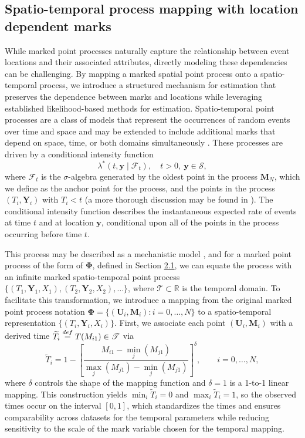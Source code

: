 \subsection{Spatio-temporal process mapping with location dependent marks}\label{stmapping}

While marked point processes naturally capture the relationship between
event locations and their associated attributes, directly modeling these
dependencies can be challenging. By mapping a marked spatial point
process onto a spatio-temporal process, we introduce a structured
mechanism for estimation that preserves the dependence between marks and
locations while leveraging established likelihood-based methods for
estimation. Spatio-temporal point processes are a class of models that
represent the occurrences of random events over time and space and may
be extended to include additional marks that depend on space, time, or
both domains simultaneously \citep{RathbunStephenL.1994ASSP}. These processes are driven by a conditional intensity function
\[\lambda^*(t, \boldsymbol{y} \mid \mathscr{F}_t), \quad t > 0, \ \boldsymbol{y} \in \mathscr{S},\]
where \(\mathscr{F}_t\) is the \(\sigma\)-algebra generated by the oldest
point in the process \(\boldsymbol{M}_N\), which we define as the anchor
point for the process, and the points in the process
\((T_i, \boldsymbol{Y}_i)\) with \(T_i < t\) (a more thorough discussion may
be found in \citet{DaleyDarylJ1988AItt}). The conditional intensity function
describes the instantaneous expected rate of events at time \(t\) and at
location \(\boldsymbol{y}\), conditional upon all of the points in the
process occurring before time \(t\).

{This process may be described as a mechanistic model
\citep{diggleStatisticalAnalysisSpatial2013}, and for a marked point process
of the form of \(\boldsymbol{\Phi}\), defined in Section \hyperref[mpp]{2.1}, we
can equate the process with an infinite marked spatio-temporal point
process
\(\{(T_1,\boldsymbol{Y}_1, X_1),  (T_2,\boldsymbol{Y}_2, X_2), \dots \}\),
where \(\mathscr{T} \subset \mathbb{R}\) is the temporal domain. To facilitate this transformation, we introduce a mapping from the original
marked point process notation \(\boldsymbol{\Phi} = \{(\boldsymbol{U}_i, \boldsymbol{M}_i): i = 0, \dots, N\}\)
to a spatio-temporal representation \(\{(T_i, \boldsymbol{Y}_i, X_i)\}\).
First, we associate each point \((\boldsymbol{U}_i,\boldsymbol{M}_i)\) with a derived time
\(\widetilde{T}_i \stackrel{\tiny def}{=}T(M_{i1}) \in \mathscr{T}\) via
\begin{equation}
\widetilde{T}_i
= 1 - \left [\frac{M_{i1} - \min_{j} (M_{j1})}{\max_{j}(M_{j1}) - \min_{j}(M_{j1})} \right ]^\delta,
\qquad i = 0,\dots,N,
  \label{eq:sizetimemapping}
\end{equation}
where \(\delta\) controls the shape of the mapping function and \(\delta=1\) is a 1-to-1 linear mapping.
This construction yields \(\min_i \widetilde{T}_i = 0\) and \(\max_i \widetilde{T}_i = 1\), so the observed times occur on the interval \([0,1]\), which standardizes the times and ensures comparability across datasets for the temporal parameters while reducing sensitivity to the scale of the mark variable chosen for the temporal mapping.}

